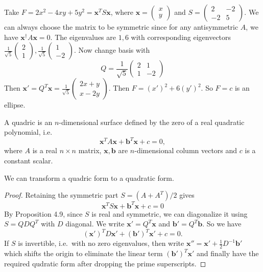 \documentclass[a4paper]{article}
\begin{document}
\begin{eg}
  Take $F = 2x^2 - 4xy + 5y^2 = \mathbf{x}^TS\mathbf{x}$, where $\mathbf{x} =
  \begin{pmatrix}
    x\\y
  \end{pmatrix}$ and $S =
  \begin{pmatrix}
    2 & -2\\
    -2 & 5
  \end{pmatrix}$.
  We can always choose the matrix to be symmetric since for any antisymmetric $A$, we have $\mathbf{x}^\dagger A\mathbf{x} = 0$.  The eigenvalues are $1, 6$ with corresponding eigenvectors $
  \displaystyle \frac{1}{\sqrt{5}}\begin{pmatrix}
    2\\1
  \end{pmatrix},\frac{1}{\sqrt{5}}
  \begin{pmatrix}
    1\\-2
  \end{pmatrix}$. Now change basis with
  \[
    Q = \frac{1}{\sqrt{5}}
    \begin{pmatrix}
      2 & 1\\
      1 & -2
    \end{pmatrix}
  \]
  Then $\mathbf{x}' = Q^T\mathbf{x} =
  \frac{1}{\sqrt{5}}\begin{pmatrix}
    2x + y\\x - 2y
  \end{pmatrix}$. Then $F = (x')^2 + 6(y')^2$. So $F = c$ is an ellipse.
\end{eg}
\begin{defi}[Quadric]
  A quadric is an $n$-dimensional surface defined by the zero of a real quadratic polynomial, i.e.
  \[
    \mathbf{x}^T A\mathbf{x} + \mathbf{b}^T\mathbf{x} + c = 0,
  \]
  where $A$ is a real $n\times n$ matrix, $\mathbf{x}, \mathbf{b}$ are $n$-dimensional column vectors and $c$ is a constant scalar.
\end{defi}
\begin{prop}
We can transform a quadric form to a quadratic form.
\end{prop}
\begin{proof}
Retaining the symmetric part $S = (A + A^T)/2$ gives
\[
  \mathbf{x}^T S\mathbf{x} + \mathbf{b}^T\mathbf{x} + c = 0
\]
By Proposition 4.9, since $S$ is real and symmetric, we can diagonalize it using $S = QDQ^T$ with $D$ diagonal. We write $\mathbf{x}' = Q^T \mathbf{x}$ and $\mathbf{b}' = Q^T \mathbf{b}$. So we have
\[
  (\mathbf{x}')^TD\mathbf{x}' + (\mathbf{b}')^T \mathbf{x}' + c = 0.
\]
If $S$ is invertible, i.e.\ with no zero eigenvalues, then write $\mathbf{x}'' = \mathbf{x}' + \frac{1}{2}D^{-1}\mathbf{b}'$ which shifts the origin to eliminate the linear term $(\mathbf{b}')^T\mathbf{x}'$ and finally have the required qudratic form after dropping the prime superscripts.
\end{proof}
\end{document}
